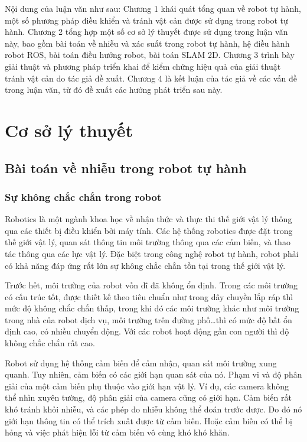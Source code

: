 Nội dung của luận văn như sau: Chương 1 khái quát tổng quan về robot tự hành, một số phương pháp điều khiển và tránh vật cản được sử dụng trong robot tự hành. Chương 2 tổng hợp một số cơ sở lý thuyết được sử dụng trong luận văn này, bao gồm bài toán về nhiễu và xác suất trong robot tự hành, hệ điều hành robot ROS, bài toán điều hướng robot, bài toán SLAM 2D. Chương 3 trình bày giải thuật và phương pháp triển khai để kiểm chứng hiệu quả của giải thuật tránh vật cản do tác giả đề xuất. Chương 4 là kết luận của tác giả về các vấn đề trong luận văn, từ đó đề xuất các hướng phát triển sau này.

\chapter{Cơ sở lý thuyết}
\label{chap:1cslt}
\section{Bài toán về nhiễu trong robot tự hành} \label{sec:2.1}
\subsection{Sự không chắc chắn trong robot}
Robotics là một ngành khoa học về nhận thức và thực thi thế giới vật lý thông qua các thiết bị điều khiển bởi máy tính. Các hệ thống robotics được đặt trong thế giới vật lý, quan sát thông tin môi trường thông qua các cảm biến, và thao tác thông qua các lực vật lý. Đặc biệt trong công nghệ robot tự hành, robot phải có khả năng đáp ứng rất lớn sự không chắc chắn tồn tại trong thế giới vật lý.

Trước hết, môi trường của robot vốn dĩ đã không ổn định. Trong các môi trường có cấu trúc tốt, được thiết kế theo tiêu chuẩn như trong dây chuyền lắp ráp thì mức độ không chắc chắn thấp, trong khi đó các môi trường khác như môi trường trong nhà của robot dịch vụ, môi trường trên đường phố\dots thì có mức độ bất ổn định cao, có nhiều chuyển động. Với các robot hoạt động gần con người thì độ không chắc chắn rất cao.

Robot sử dụng hệ thống cảm biến để cảm nhận, quan sát môi trường xung quanh. Tuy nhiên, cảm biến có các giới hạn quan sát của nó. Phạm vi và độ phân giải của một cảm biến phụ thuộc vào giới hạn vật lý. Ví dụ, các camera không thể nhìn xuyên tường, độ phân giải của camera cũng có giới hạn. Cảm biến rất khó tránh khỏi nhiễu, và các phép đo nhiễu không thể đoán trước được. Do đó nó giới hạn thông tin có thể trích xuất được từ cảm biến. Hoặc cảm biến có thể bị hỏng và việc phát hiện lỗi từ cảm biến vô cùng khó khó khăn.

